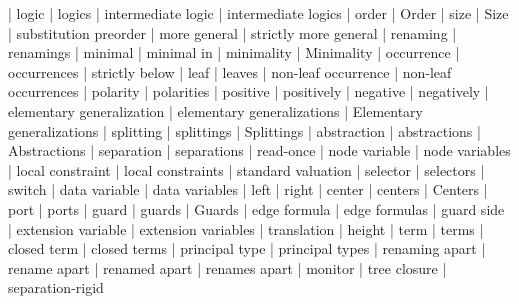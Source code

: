 
 | logic
 | logics
 | intermediate logic
 | intermediate logics
 | order
 | Order
 | size
 | Size
 | substitution preorder
 | more general
 | strictly more general
 | renaming
 | renamings
 | minimal
 | minimal in
 | minimality
 | Minimality
 | occurrence
 | occurrences
 | strictly below
 | leaf
 | leaves
 | non-leaf occurrence
 | non-leaf occurrences
 | polarity
 | polarities
 | positive
 | positively
 | negative
 | negatively
 | elementary generalization
 | elementary generalizations
 | Elementary generalizations
 | splitting
 | splittings
 | Splittings
 | abstraction
 | abstractions
 | Abstractions
 | separation
 | separations
 | read-once
 | node variable
 | node variables
 | local constraint
 | local constraints
 | standard valuation
 | selector
 | selectors
 | switch
 | data variable
 | data variables
 | left
 | right
 | center
 | centers
 | Centers
 | port
 | ports
 | guard
 | guards
 | Guards
 | edge formula
 | edge formulas
 | guard side
 | extension variable
 | extension variables
 | translation
 | height
 | term
 | terms
 | closed term
 | closed terms
 | principal type
 | principal types
 | renaming apart
 | rename apart
 | renamed apart
 | renames apart
 | monitor
 | tree closure
 | separation-rigid
